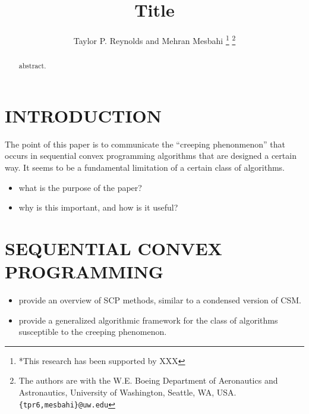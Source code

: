 \documentclass[letterpaper, 10 pt, conference]{ieeeconf}
\title{\LARGE \bf Title
}
\author{Taylor P. Reynolds and Mehran Mesbahi%
\thanks{*This research has been supported by XXX}%
\thanks{The authors are with the W.E. Boeing Department of Aeronautics and Astronautics,
        University of Washington, Seattle, WA, USA.
        {\tt\small \{tpr6,mesbahi\}@uw.edu}}%
}
\begin{document}
\maketitle
\thispagestyle{empty}
\pagestyle{empty}


\begin{abstract}

abstract.

\end{abstract}


\section{INTRODUCTION}

The point of this paper is to communicate the ``creeping phenonmenon'' that occurs in sequential convex programming algorithms that are designed a certain way. It seems to be a fundamental limitation of a certain class of algorithms. 

\begin{itemize}
\item what is the purpose of the paper?
\item why is this important, and how is it useful?
\end{itemize}

\section{SEQUENTIAL CONVEX PROGRAMMING}

\begin{itemize}
\item provide an overview of SCP methods, similar to a condensed version of CSM.
\item provide a generalized algorithmic framework for the class of algorithms susceptible to the creeping phenomenon.
\end{itemize}
\end{document}
